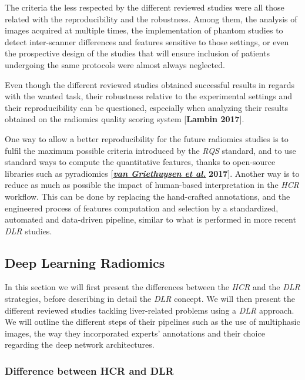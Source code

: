 \documentclass[]{article}
\begin{document}
The criteria the less respected by the different reviewed studies were
all those related with the reproducibility and the robustness. Among
them, the analysis of images acquired at multiple times, the
implementation of phantom studies to detect inter-scanner differences
and features sensitive to those settings, or even the prospective design
of the studies that will ensure inclusion of patients undergoing the
same protocols were almost always neglected.

Even though the different reviewed studies obtained successful results
in regards with the wanted task, their robustness relative to the
experimental settings and their reproducibility can be questioned,
especially when analyzing their results obtained on the radiomics
quality scoring system {[}\textbf{Lambin 2017}{]}.

One way to allow a better reproducibility for the future radiomics
studies is to fulfil the maximum possible criteria introduced by the
\emph{RQS} standard, and to use standard ways to compute the
quantitative features, thanks to open-source libraries such as
pyradiomics
{[}\href{https://pyradiomics.readthedocs.io/en/latest/}{\textbf{\emph{van
Griethuysen et al.}}} \textbf{2017}{]}. Another way is to reduce as much
as possible the impact of human-based interpretation in the \emph{HCR}
workflow. This can be done by replacing the hand-crafted annotations,
and the engineered process of features computation and selection by a
standardized, automated and data-driven pipeline, similar to what is
performed in more recent \emph{DLR} studies.

\subsection{Deep Learning Radiomics}\label{deep-learning-radiomics}

In this section we will first present the differences between the
\emph{HCR} and the \emph{DLR} strategies, before describing in detail
the \emph{DLR} concept. We will then present the different reviewed
studies tackling liver-related problems using a \emph{DLR} approach. We
will outline the different steps of their pipelines such as the use of
multiphasic images, the way they incorporated experts' annotations and
their choice regarding the deep network architectures.

\subsubsection{Difference between HCR and
DLR}\label{difference-between-hcr-and-dlr}
\end{document}
